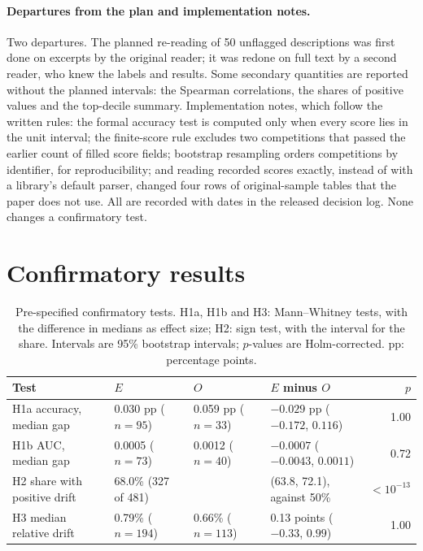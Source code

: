 \documentclass[10pt]{article}
\begin{document}
\paragraph{Departures from the plan and implementation notes.} Two departures. The planned re-reading of 50 unflagged descriptions was first done on excerpts by the original reader; it was redone on full text by a second reader, who knew the labels and results. Some secondary quantities are reported without the planned intervals: the Spearman correlations, the shares of positive values and the top-decile summary. Implementation notes, which follow the written rules: the formal accuracy test is computed only when every score lies in the unit interval; the finite-score rule excludes two competitions that passed the earlier count of filled score fields; bootstrap resampling orders competitions by identifier, for reproducibility; and reading recorded scores exactly, instead of with a library's default parser, changed four rows of original-sample tables that the paper does not use. All are recorded with dates in the released decision log. None changes a confirmatory test.

\section{Confirmatory results}
\label{sec:confirm}

\begin{table}[t]
\caption{Pre-specified confirmatory tests. H1a, H1b and H3: Mann--Whitney tests, with the difference in medians as effect size; H2: sign test, with the interval for the share. Intervals are 95\% bootstrap intervals; $p$-values are Holm-corrected. pp: percentage points.}
\label{tab:confirm}
\centering\small\setlength{\tabcolsep}{4pt}
\begin{tabular}{llllr}
\toprule
Test & $E$ & $O$ & $E$ minus $O$ & $p$ \\
\midrule
H1a accuracy, median gap & 0.030 pp ($n=95$) & 0.059 pp ($n=33$) & $-0.029$ pp ($-0.172$, $0.116$) & 1.00 \\
H1b AUC, median gap & 0.0005 ($n=73$) & 0.0012 ($n=40$) & $-0.0007$ ($-0.0043$, $0.0011$) & 0.72 \\
H2 share with positive drift & 68.0\% (327 of 481) & & (63.8, 72.1), against 50\% & $<10^{-13}$ \\
H3 median relative drift & 0.79\% ($n=194$) & 0.66\% ($n=113$) & 0.13 points ($-0.33$, $0.99$) & 1.00 \\
\bottomrule
\end{tabular}
\end{table}
\end{document}
